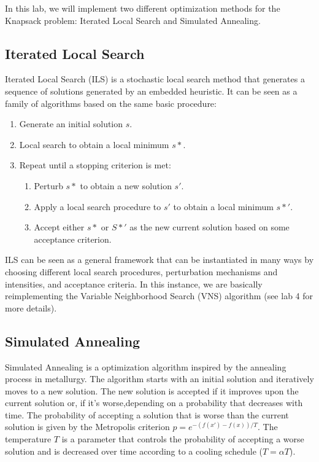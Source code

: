 In this lab, we will implement two different optimization methods for the Knapsack problem: Iterated Local Search and Simulated Annealing.
\subsection{Iterated Local Search}
Iterated Local Search (ILS) is a stochastic local search method that generates a sequence of solutions generated by an embedded heuristic. It can be seen as a family of algorithms based on the same basic procedure:
\begin{enumerate}
    \item Generate an initial solution $s$.
    \item Local search to obtain a local minimum $s*$.
    \item Repeat until a stopping criterion is met:
          \begin{enumerate}
              \item Perturb $s*$ to obtain a new solution $s'$.
              \item Apply a local search procedure to $s'$ to obtain a local minimum $s*'$.
              \item Accept either $s*$ or $S*'$ as the new current solution based on some acceptance criterion.
          \end{enumerate}
\end{enumerate}
ILS can be seen as a general framework that can be instantiated in many ways by choosing different local search procedures, perturbation mechanisms and intensities, and acceptance criteria. In this instance, we are basically reimplementing the Variable Neighborhood Search (VNS) algorithm (see lab 4 for more details).

\subsection{Simulated Annealing}
Simulated Annealing is a optimization algorithm inspired by the annealing process in metallurgy. The algorithm starts with an initial solution and iteratively moves to a new solution. The new solution is accepted if it improves upon the current solution or, if it's worse,depending on a probability that decreases with time. The probability of accepting a solution that is worse than the current solution is given by the Metropolis criterion $p = e^{-(f(x')-f(x))/T}$. The temperature $T$ is a parameter that controls the probability of accepting a worse solution and is decreased over time according to a cooling schedule ($T = \alpha T$).

